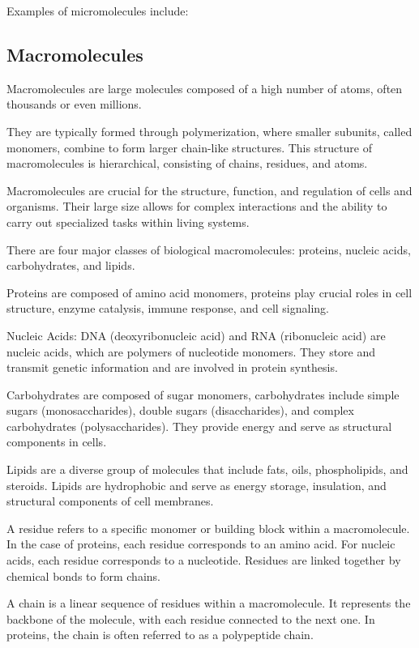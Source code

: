 \documentclass[
  digital,     %
  oneside,     %
  nosansbold,  %
  nocolorbold, %
  lof,         %
  lot,         %
]{fithesis4}
\begin{document}
Examples of micromolecules include:

\subsection{Macromolecules}

Macromolecules are large molecules composed of a high number of atoms, often thousands or even millions.

They are typically formed through polymerization, where smaller subunits, called monomers, combine to form larger chain-like structures. This structure of macromolecules is hierarchical, consisting of chains, residues, and atoms.

 Macromolecules are crucial for the structure, function, and regulation of cells and organisms. Their large size allows for complex interactions and the ability to carry out specialized tasks within living systems.

There are four major classes of biological macromolecules: proteins, nucleic acids, carbohydrates, and lipids.

Proteins are composed of amino acid monomers, proteins play crucial roles in cell structure, enzyme catalysis, immune response, and cell signaling.

Nucleic Acids: DNA (deoxyribonucleic acid) and RNA (ribonucleic acid) are nucleic acids, which are polymers of nucleotide monomers. They store and transmit genetic information and are involved in protein synthesis.

Carbohydrates are composed of sugar monomers, carbohydrates include simple sugars (monosaccharides), double sugars (disaccharides), and complex carbohydrates (polysaccharides). They provide energy and serve as structural components in cells.

Lipids are a diverse group of molecules that include fats, oils, phospholipids, and steroids. Lipids are hydrophobic and serve as energy storage, insulation, and structural components of cell membranes.


A residue refers to a specific monomer or building block within a macromolecule. In the case of proteins, each residue corresponds to an amino acid. For nucleic acids, each residue corresponds to a nucleotide. Residues are linked together by chemical bonds to form chains.

A chain is a linear sequence of residues within a macromolecule. It represents the backbone of the molecule, with each residue connected to the next one. In proteins, the chain is often referred to as a polypeptide chain.
\end{document}

